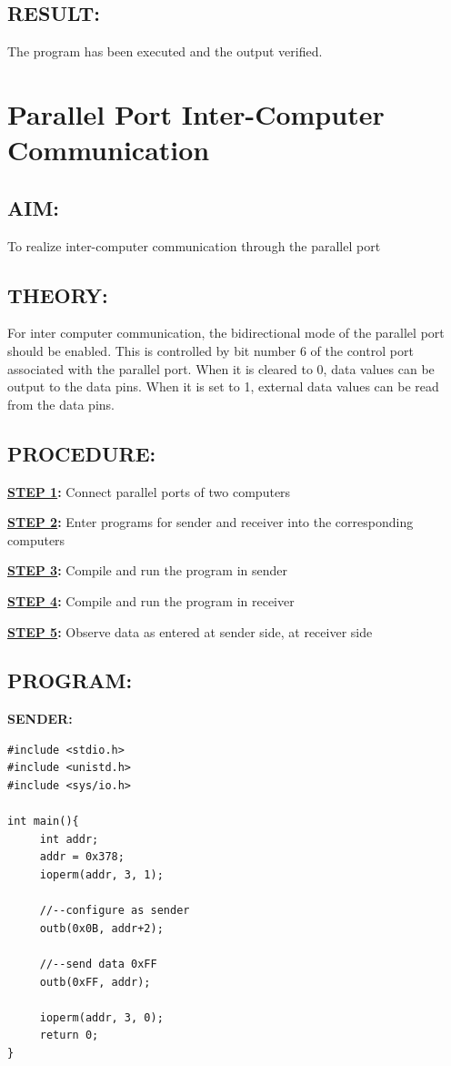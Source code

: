 \documentclass[a4paper,28pt]{report}
\begin{document}
\section*{RESULT:}
The program has been executed and the output verified.
%
%
\chapter{Parallel Port Inter-Computer Communication}
%
%
%
%
\section*{AIM:}
To realize inter-computer communication through the parallel port
\section*{THEORY:}
For inter computer communication, the bidirectional mode of the parallel port should be enabled. This is controlled by bit number 6 of the control port associated with the parallel port. When it is cleared to 0, data values can be output to the data pins. When it is set to 1, external data values can be read from the data pins.
\section*{PROCEDURE:}
\textbf{\underline{STEP 1}:} Connect parallel ports of two computers

\textbf{\underline{STEP 2}:} Enter programs for sender and receiver into the corresponding\\\hspace*{55pt}computers

\textbf{\underline{STEP 3}:} Compile and run the program in sender

\textbf{\underline{STEP 4}:} Compile and run the program in receiver

\textbf{\underline{STEP 5}:} Observe data as entered at sender side, at receiver side

\newpage
\section*{PROGRAM:}
\textbf{SENDER:}
\begin{lstlisting}
#include <stdio.h>
#include <unistd.h>
#include <sys/io.h>

int main(){
     int addr;
     addr = 0x378;
     ioperm(addr, 3, 1);
     
     //--configure as sender
     outb(0x0B, addr+2);
     
     //--send data 0xFF
     outb(0xFF, addr);
     
     ioperm(addr, 3, 0);
     return 0;
}
\end{lstlisting}
\end{document}
